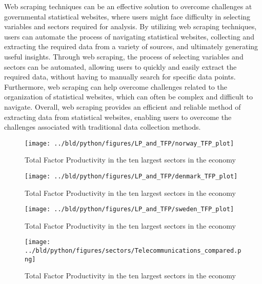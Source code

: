 \documentclass[11pt, a4paper, leqno]{article}
\begin{document}
Web scraping techniques can be an effective solution to overcome challenges at governmental statistical 
websites, where users might face difficulty in selecting variables and sectors required for analysis. By 
utilizing web scraping techniques, users can automate the process of navigating statistical websites, 
collecting and extracting the required data from a variety of sources, and ultimately generating useful
insights. Through web scraping, the process of selecting variables and sectors can be automated, 
allowing users to quickly and easily extract the required data, without having to manually search for 
specific data points. Furthermore, web scraping can help overcome challenges related to the organization 
of statistical websites, which can often be complex and difficult to navigate. Overall, web scraping provides 
an efficient and reliable method of extracting data from statistical websites, enabling users to overcome 
the challenges associated with traditional data collection methods.

\begin{figure}[H]

    \centering
    \texttt{[image: ../bld/python/figures/LP\_and\_TFP/norway\_TFP\_plot]}

    \caption{Total Factor Productivity in the ten largest sectors in the economy}
    \label{fig:python-predictions}

\end{figure}

\begin{figure}[H]

    \centering
    \texttt{[image: ../bld/python/figures/LP\_and\_TFP/denmark\_TFP\_plot]}

    \caption{Total Factor Productivity in the ten largest sectors in the economy}
    \label{fig:python-predictions}

\end{figure}

\begin{figure}[H]

    \centering
    \texttt{[image: ../bld/python/figures/LP\_and\_TFP/sweden\_TFP\_plot]}

    \caption{Total Factor Productivity in the ten largest sectors in the economy}
    \label{fig:python-predictions}

\end{figure}


\begin{figure}[H]

    \centering
    \texttt{[image: ../bld/python/figures/sectors/Telecommunications\_compared.png]}

    \caption{Total Factor Productivity in the ten largest sectors in the economy}
    \label{fig:python-predictions}

\end{figure}
\end{document}
